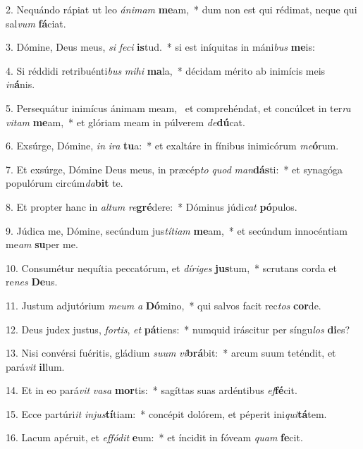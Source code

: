2. Nequándo rápiat ut leo \textit{á}\textit{ni}\textit{mam} \textbf{me}am,~*  dum non est qui rédimat, neque qui sal\textit{vum} \textbf{fá}ciat.\

3. Dómine, Deus meus, \textit{si} \textit{fe}\textit{ci} \textbf{is}tud.~*  si est iníquitas in máni\textit{bus} \textbf{me}is:\

4. Si réddidi retribuénti\textit{bus} \textit{mi}\textit{hi} \textbf{ma}la,~*  décidam mérito ab inimícis meis \textit{in}\textbf{á}nis.\

5. Persequátur inimícus ánimam meam, \dag\  et comprehéndat, et concúlcet in ter\textit{ra} \textit{vi}\textit{tam} \textbf{me}am,~*  et glóriam meam in púlverem \textit{de}\textbf{dú}cat.\

6. Exsúrge, Dómine, \textit{in} \textit{i}\textit{ra} \textbf{tu}a:~*  et exaltáre in fínibus inimicórum \textit{me}\textbf{ó}rum.\

7. Et exsúrge, Dómine Deus meus, in præcép\textit{to} \textit{quod} \textit{man}\textbf{dás}ti:~*  et synagóga populórum circúm\textit{da}\textbf{bit} te.\

8. Et propter hanc in \textit{al}\textit{tum} \textit{re}\textbf{gré}dere:~*  Dóminus júdi\textit{cat} \textbf{pó}pulos.\

9. Júdica me, Dómine, secúndum jus\textit{tí}\textit{ti}\textit{am} \textbf{me}am,~*  et secúndum innocéntiam me\textit{am} \textbf{su}per me.\

10. Consumétur nequítia peccatórum, et \textit{dí}\textit{ri}\textit{ges} \textbf{jus}tum,~*  scrutans corda et re\textit{nes} \textbf{De}us.\

11. Justum adjutórium \textit{me}\textit{um} \textit{a} \textbf{Dó}mino,~*  qui salvos facit rec\textit{tos} \textbf{cor}de.\

12. Deus judex justus, \textit{for}\textit{tis}, \textit{et} \textbf{pá}tiens:~*  numquid iráscitur per síngu\textit{los} \textbf{di}es?\

13. Nisi convérsi fuéritis, gládium \textit{su}\textit{um} \textit{vi}\textbf{brá}bit:~*  arcum suum teténdit, et pará\textit{vit} \textbf{il}lum.\

14. Et in eo pará\textit{vit} \textit{va}\textit{sa} \textbf{mor}tis:~*  sagíttas suas ardéntibus \textit{ef}\textbf{fé}cit.\

15. Ecce partúri\textit{it} \textit{in}\textit{jus}\textbf{tí}tiam:~*  concépit dolórem, et péperit ini\textit{qui}\textbf{tá}tem.\

16. Lacum apéruit, et \textit{ef}\textit{fó}\textit{dit} \textbf{e}um:~*  et íncidit in fóveam \textit{quam} \textbf{fe}cit.\

